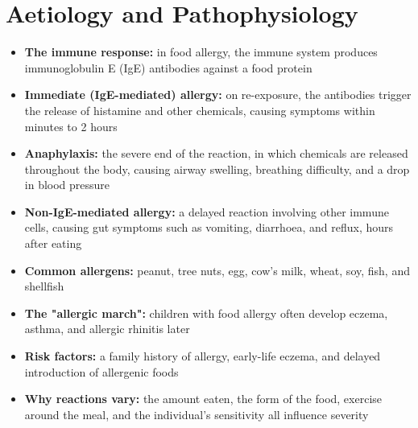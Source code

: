 \section*{Aetiology and Pathophysiology}
\begin{itemize}
    \item \textbf{The immune response:} in food allergy, the immune system produces immunoglobulin E (IgE) antibodies against a food protein
    \item \textbf{Immediate (IgE-mediated) allergy:} on re-exposure, the antibodies trigger the release of histamine and other chemicals, causing symptoms within minutes to 2 hours
    \item \textbf{Anaphylaxis:} the severe end of the reaction, in which chemicals are released throughout the body, causing airway swelling, breathing difficulty, and a drop in blood pressure
    \item \textbf{Non-IgE-mediated allergy:} a delayed reaction involving other immune cells, causing gut symptoms such as vomiting, diarrhoea, and reflux, hours after eating
    \item \textbf{Common allergens:} peanut, tree nuts, egg, cow's milk, wheat, soy, fish, and shellfish
    \item \textbf{The "allergic march":} children with food allergy often develop eczema, asthma, and allergic rhinitis later
    \item \textbf{Risk factors:} a family history of allergy, early-life eczema, and delayed introduction of allergenic foods
    \item \textbf{Why reactions vary:} the amount eaten, the form of the food, exercise around the meal, and the individual's sensitivity all influence severity
\end{itemize}

